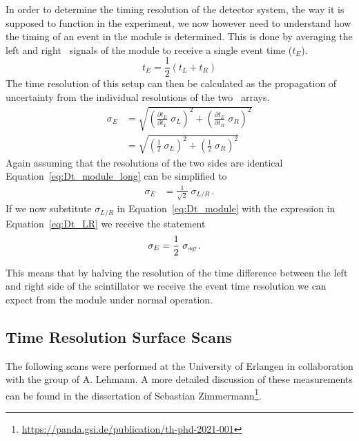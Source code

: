 \documentclass[../BTOF_summary.tex]{subfiles}
\begin{document}
%
In order to determine the timing resolution of the detector system, the way it is supposed to function in the experiment, we now however need to understand how the timing of an event in the module is determined. This is done by averaging the left and right \sipm\ signals of the module to receive a single event time ($t_E$).
\begin{equation*}
t_{E} = \frac{1}{2} \left( t_{L} + t_{R} \right)
\end{equation*} 
%
The time resolution of this setup can then be calculated as the propagation of uncertainty from the individual resolutions of the two \sipm\ arrays.
%
\begin{align}
	\sigma_{E} &= \sqrt{ \left( \frac{\partial t_{E}}{\partial t_{L}} \; \sigma_{L} \right)^2 + \left( \frac{\partial t_{E}}{\partial  t_{R}} \; \sigma_{R} \right)^2 } \nonumber \\
	 &= \sqrt{ \left( \frac{1}{2} \; \sigma_L \right)^2 + \left( \frac{1}{2} \; \sigma_R \right) ^2 } \label{eq:Dt_module_long}
\end{align}
%
Again assuming that the resolutions of the two sides are identical Equation~\eqref{eq:Dt_module_long} can be simplified to 
%
\begin{align}
	\sigma_{E} &=  \frac{1}{\sqrt{2}} \; \sigma_{L/R} \, . \label{eq:Dt_module}
\end{align}
If we now substitute $\sigma_{L/R}$ in Equation~\eqref{eq:Dt_module} with the expression in Equation~\eqref{eq:Dt_LR} we receive the statement
\begin{align}
	\sigma_{E} &= \frac{1}{2} \; \sigma_{\textit{\tiny diff}} \, . \label{eq:time_resolution_Erlangen}
\end{align}

This means that by halving the resolution of the time difference between the left and right side of the scintillator we receive the event time resolution we can expect from the module under normal operation.

\subsection{Time Resolution Surface Scans}
The following scans were performed at the University of Erlangen in collaboration with the group of A. Lehmann.
A more detailed discussion of these measurements can be found in the dissertation of Sebastian Zimmermann\footnote{\url{https://panda.gsi.de/publication/th-phd-2021-001}}.
\end{document}
